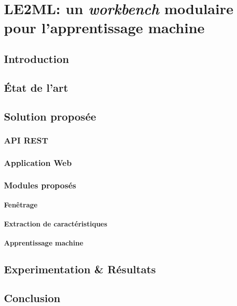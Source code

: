 \chapter{LE2ML: un \textit{workbench} modulaire pour l'apprentissage machine}
\label{chap:7}

\section{Introduction}

\section{État de l'art}

\section{Solution proposée}

\subsection{API REST}

\subsection{Application Web}

\subsection{Modules proposés}

\subsubsection{Fenêtrage}

\subsubsection{Extraction de caractéristiques}

\subsubsection{Apprentissage machine}

\section{Experimentation \& Résultats}

\section{Conclusion}